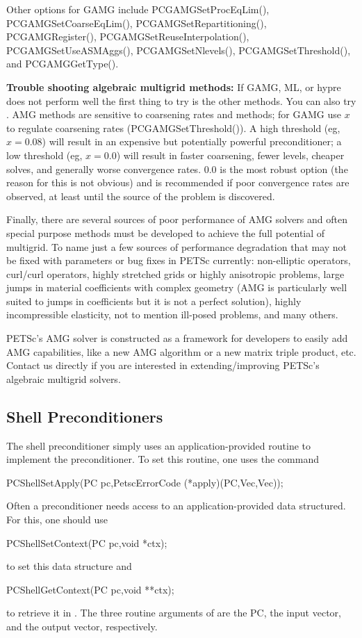 Other options for GAMG include PCGAMGSetProcEqLim(),
PCGAMGSetCoarseEqLim(), PCGAMGSetRepartitioning(),
PCGAMGRegister(), PCGAMGSetReuseInterpolation(),
PCGAMGSetUseASMAggs(), PCGAMGSetNlevels(),
PCGAMGSetThreshold(), and PCGAMGGetType().


{\bf Trouble shooting algebraic multigrid methods:}  If GAMG, ML, or hypre does not perform well the
first thing to try is the other methods.
You can also try  .
AMG methods are sensitive to coarsening rates and methods; for GAMG use
 $x$ to regulate coarsening rates (PCGAMGSetThreshold()).
A high threshold (eg, $x=0.08$) will result in an expensive but potentially
powerful preconditioner; a low threshold (eg, $x=0.0$) will result in
faster coarsening, fewer levels, cheaper solves, and generally worse
convergence rates.
 $0.0$ is the most robust option (the reason for
this is not obvious) and is recommended if poor convergence rates are
observed, at least until the source of the problem is discovered.

Finally, there are several sources of poor performance of
AMG solvers and often special purpose methods must be developed to
achieve the full potential of multigrid.
To name just a few sources of performance degradation that
may not be fixed with parameters or bug fixes in PETSc currently: non-elliptic
operators, curl/curl operators, highly stretched grids or highly anisotropic problems,
large jumps in material coefficients with complex geometry (AMG is
particularly well suited to jumps in coefficients but it is not a
perfect solution), highly incompressible elasticity, not to mention
ill-posed problems, and many others.

PETSc's AMG solver is constructed as a framework for developers to
easily add AMG capabilities, like a new AMG algorithm or a new matrix
triple product, etc. Contact us directly if you are interested in extending/improving PETSc's algebraic multigrid solvers.


\subsection{Shell Preconditioners}

The shell preconditioner simply uses an application-provided routine to
implement the preconditioner. To set this routine, one uses the
command
\begin{tabbing}
  PCShellSetApply(PC pc,PetscErrorCode (*apply)(PC,Vec,Vec));
\end{tabbing}
Often a preconditioner needs access to an application-provided data
structured.  For this, one should use
\begin{tabbing}
  PCShellSetContext(PC pc,void *ctx);
\end{tabbing}
to set this data structure and
\begin{tabbing}
  PCShellGetContext(PC pc,void **ctx);
\end{tabbing}
to retrieve it in .  The three routine arguments of
 are the PC, the input vector, and the output vector,
respectively.

